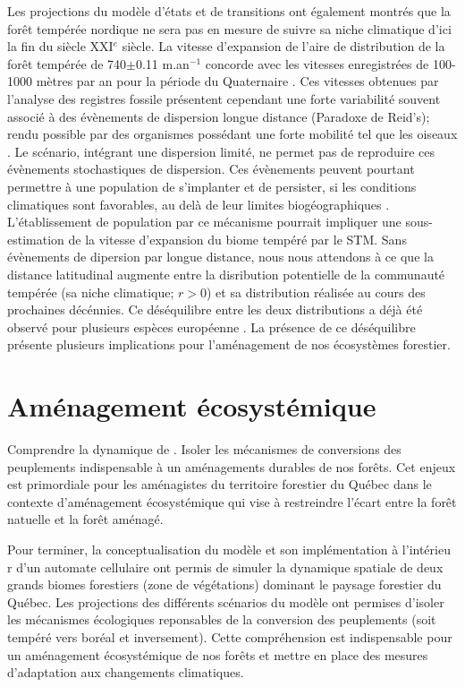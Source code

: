Les projections du modèle d'états et de transitions ont également montrés que la forêt tempérée
nordique ne sera pas en mesure de suivre sa niche climatique d'ici la fin du siècle XXI$^e$ siècle.
La vitesse d'expansion de l'aire de distribution de la forêt tempérée de 740$\pm$0.11 m.an$^{-1}$
concorde avec les vitesses enregistrées de 100-1000 mètres par an pour la période du Quaternaire
\citep{Davis1981}. Ces vitesses obtenues par l'analyse des registres fossile présentent cependant
une forte variabilité souvent associé à des évènements de dispersion longue distance (Paradoxe de
Reid's); rendu possible par des organismes possédant une forte mobilité tel que les oiseaux
\citep{Clark1998}. Le scénario, intégrant une dispersion limité, ne permet pas de reproduire ces
évènements stochastiques de dispersion. Ces évènements peuvent pourtant permettre à une population
de s'implanter et de persister, si les conditions climatiques sont favorables, au delà de leur
limites biogéographiques \citep{Clark1998}. L'établissement de population par ce mécanisme pourrait
impliquer une sous-estimation de la vitesse d'expansion du biome tempéré par le STM.  Sans
évènements de dipersion par longue distance, nous nous attendons à ce que la distance latitudinal
augmente entre la disribution potentielle de la communauté tempérée (sa niche climatique; $r>0$) et
sa distribution réalisée au cours des prochaines décénnies. Ce déséquilibre entre les deux
distributions a déjà été observé pour plusieurs espèces européenne \citep{Svenning2004}. La présence
de ce déséquilibre présente plusieurs implications pour l'aménagement de nos écosystèmes forestier.

\section*{Aménagement écosystémique}

Comprendre la dynamique de . Isoler les mécanismes de conversions des peuplements indispensable à un aménagements durables de nos forêts. Cet enjeux est primordiale pour les aménagistes du territoire forestier du Québec dans le contexte d'aménagement écosystémique qui vise à restreindre l'écart entre la forêt natuelle et la forêt aménagé.

Pour terminer, la conceptualisation du modèle et son implémentation à l'intérieu  r d'un automate
cellulaire ont permis de simuler la dynamique spatiale de deux grands biomes forestiers (zone de
végétations) dominant le paysage forestier du Québec. Les projections des différents scénarios du
modèle ont permises d'isoler les mécanismes écologiques reponsables de la conversion des peuplements
(soit tempéré vers boréal et inversement). Cette compréhension est indispensable pour un aménagement
écosystémique de nos forêts et mettre en place des mesures d'adaptation aux changements climatiques.

